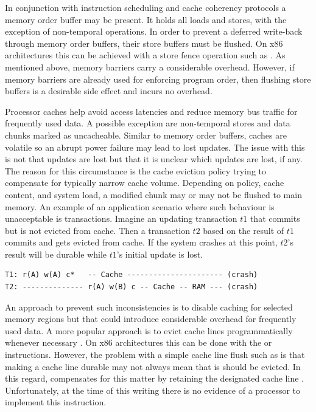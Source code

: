 
In conjunction with instruction scheduling and cache coherency protocols a
memory order buffer may be present. It holds all loads and stores, with the
exception of non-temporal operations. In order to prevent a deferred write-back
through memory order buffers, their store buffers must be flushed. On x86
architectures this can be achieved with a store fence operation such as
. As mentioned above, memory barriers carry a considerable
overhead. However, if memory barriers are already used for enforcing program
order, then flushing store buffers is a desirable side effect and incurs no
overhead.


Processor caches help avoid access latencies and reduce memory bus traffic for
frequently used data. A possible exception are non-temporal stores and data
chunks marked as uncacheable. Similar to memory order buffers, caches are
volatile so an abrupt power failure may lead to lost updates. The issue with
this is not that updates are lost but that it is unclear which updates are lost,
if any. The reason for this circumstance is the cache eviction policy trying to
compensate for typically narrow cache volume. Depending on policy, cache
content, and system load, a modified chunk may or may not be flushed to main
memory. An example of an application scenario where such behaviour is
unacceptable is transactions. Imagine an updating transaction $t1$ that commits
but is not evicted from cache. Then a transaction $t2$ based on the result of
$t1$ commits and gets evicted from cache. If the system crashes at this point,
$t2$'s result will be durable while $t1$'s initial update is lost.


\begin{lstlisting}
T1: r(A) w(A) c*   -- Cache ---------------------- (crash)
T2: -------------- r(A) w(B) c -- Cache -- RAM --- (crash)
\end{lstlisting}

An approach to prevent such inconsistencies is to disable caching for selected
memory regions but that could introduce considerable overhead for frequently
used data. A more popular approach is to evict cache lines programmatically
whenever necessary \cite{condit2009better, dulloor2014system, oukid2017data}. On
x86 architectures this can be done with the  or 
instructions. However, the problem with a simple cache line flush such as
 is that making a cache line durable may not always mean that is
should be evicted. In this regard,  compensates for this matter by
retaining the designated cache line \cite{kolli2016high}. Unfortunately, at the
time of this writing there is no evidence of a processor to implement this
instruction.

